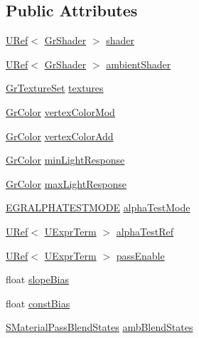 \subsection*{Public Attributes}
\begin{CompactItemize}
\item 
\hyperlink{class_u_ref}{URef}$<$ \hyperlink{class_gr_shader}{GrShader} $>$ \hyperlink{struct_s_material_pass_info_88f257e5b6e6b9e21392219be74df05c}{shader}
\item 
\hyperlink{class_u_ref}{URef}$<$ \hyperlink{class_gr_shader}{GrShader} $>$ \hyperlink{struct_s_material_pass_info_b355f2664fb9a12aaf019c80a5b54a03}{ambientShader}
\item 
\hyperlink{class_gr_texture_set}{GrTextureSet} \hyperlink{struct_s_material_pass_info_3696de9c4421b3ff40036e84bde3e630}{textures}
\item 
\hyperlink{class_gr_color}{GrColor} \hyperlink{struct_s_material_pass_info_a129865ee753ac3056cd69490330f782}{vertexColorMod}
\item 
\hyperlink{class_gr_color}{GrColor} \hyperlink{struct_s_material_pass_info_8d6e08ed3afd1c51ea0320bd485dadf5}{vertexColorAdd}
\item 
\hyperlink{class_gr_color}{GrColor} \hyperlink{struct_s_material_pass_info_ac97ff420977ef457316e478e8827cda}{minLightResponse}
\item 
\hyperlink{class_gr_color}{GrColor} \hyperlink{struct_s_material_pass_info_5ee16644b6f677c6eae42bf410a43dfd}{maxLightResponse}
\item 
\hyperlink{_gr_util_8h_abff98128b1f220d1ceff538f4abdef3}{EGRALPHATESTMODE} \hyperlink{struct_s_material_pass_info_8c047353d3e838c5a3d11ba448847d23}{alphaTestMode}
\item 
\hyperlink{class_u_ref}{URef}$<$ \hyperlink{class_u_expr_term}{UExprTerm} $>$ \hyperlink{struct_s_material_pass_info_9209733df2e6a655d595dfc1d810b28f}{alphaTestRef}
\item 
\hyperlink{class_u_ref}{URef}$<$ \hyperlink{class_u_expr_term}{UExprTerm} $>$ \hyperlink{struct_s_material_pass_info_47066b32f4d65c956ec8789a7ec14fb2}{passEnable}
\item 
float \hyperlink{struct_s_material_pass_info_43b0b16486a5a825210158b5c55db342}{slopeBias}
\item 
float \hyperlink{struct_s_material_pass_info_e2071f6643a25e1f3866adb9b33c5079}{constBias}
\item 
\hyperlink{struct_s_material_pass_blend_states}{SMaterialPassBlendStates} \hyperlink{struct_s_material_pass_info_855f746e614b3eb8146603d2efe46663}{ambBlendStates}

\end{CompactItemize}
